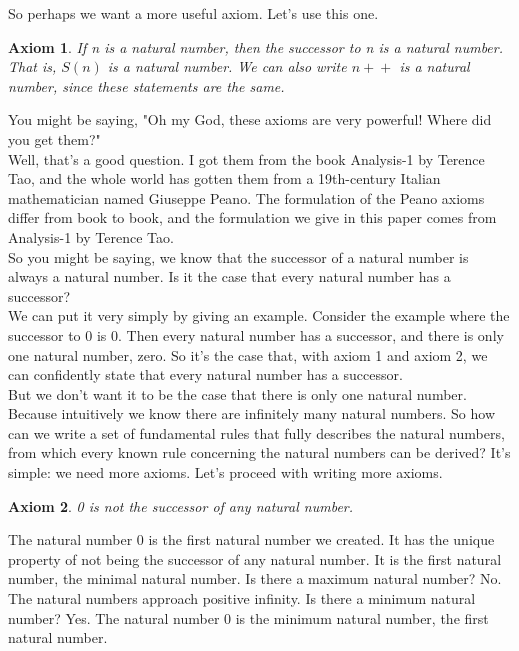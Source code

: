 \documentclass{article}
\newtheorem{axiom}{Axiom}
\newcommand{\inc}[1]{\mathrel{{{#1}+}+}}
\begin{document}
So perhaps we want a more useful axiom. Let's use this one. 

\begin{axiom}
If n is a natural number, then the successor to n is a natural number. That is, $S(n)$ is a natural number. We can also write $\inc{n}$ is a natural number, since these statements are the same.
\end{axiom}

You might be saying, "Oh my God, these axioms are very powerful! Where did you get them?" \\

Well, that's a good question. I got them from the book Analysis-1 by Terence Tao, and the whole world has gotten them from a 19th-century Italian mathematician named Giuseppe Peano. The formulation of the Peano axioms differ from book to book, and the formulation we give in this paper comes from Analysis-1 by Terence Tao. \\

So you might be saying, we know that the successor of a natural number is always a natural number. Is it the case that every natural number has a successor? \\

We can put it very simply by giving an example. Consider the example where the successor to 0 is 0. Then every natural number has a successor, and there is only one natural number, zero. So it's the case that, with axiom 1 and axiom 2, we can confidently state that every natural number has a successor. \\

But we don't want it to be the case that there is only one natural number. Because intuitively we know there are infinitely many natural numbers. So how can we write a set of fundamental rules that fully describes the natural numbers, from which every known rule concerning the natural numbers can be derived? It's simple: we need more axioms. Let's proceed with writing more axioms.

\begin{axiom}
0 is not the successor of any natural number.
\end{axiom}

The natural number 0 is the first natural number we created. It has the unique property of not being the successor of any natural number. It is the first natural number, the minimal natural number. Is there a maximum natural number? No. The natural numbers approach positive infinity. Is there a minimum natural number? Yes. The natural number 0 is the minimum natural number, the first natural number. \\
\end{document}
